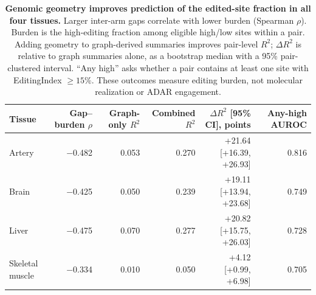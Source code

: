 \begin{table}[H]
\centering
\caption{\textbf{Genomic geometry improves prediction of the edited-site fraction in all four tissues.} Larger inter-arm gaps correlate with lower burden (Spearman $\rho$). Burden is the high-editing fraction among eligible high/low sites within a pair. Adding geometry to graph-derived summaries improves pair-level $R^2$; $\Delta R^2$ is relative to graph summaries alone, as a bootstrap median with a 95\% pair-clustered interval. ``Any high'' asks whether a pair contains at least one site with EditingIndex $\geq15\%$. These outcomes measure editing burden, not molecular realization or ADAR engagement.}\label{tab:substraterealization}
\begin{tabular}{lrrrrr}
\toprule
Tissue & Gap--burden $\rho$ & Graph-only $R^2$ & Combined $R^2$ & $\Delta R^2$ [95\% CI], points & Any-high AUROC \\
\midrule
Artery & $-$0.482 & 0.053 & 0.270 & +21.64 [+16.39, +26.93] & 0.816 \\
Brain & $-$0.425 & 0.050 & 0.239 & +19.11 [+13.94, +23.68] & 0.749 \\
Liver & $-$0.475 & 0.070 & 0.277 & +20.82 [+15.75, +26.03] & 0.728 \\
Skeletal muscle & $-$0.334 & 0.010 & 0.050 & +4.12 [+0.99, +6.98] & 0.705 \\
\bottomrule
\end{tabular}
\end{table}
